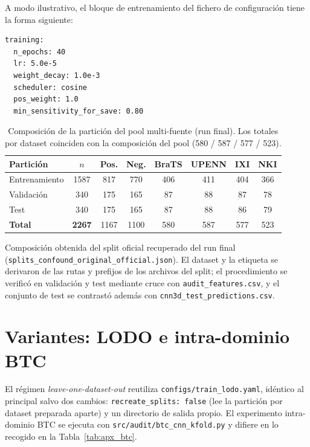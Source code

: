 A modo ilustrativo, el bloque de entrenamiento del fichero de configuración tiene
la forma siguiente:

\begin{verbatim}
training:
  n_epochs: 40
  lr: 5.0e-5
  weight_decay: 1.0e-3
  scheduler: cosine
  pos_weight: 1.0
  min_sensitivity_for_save: 0.80
\end{verbatim}

\begin{table}[ht]
  \centering
  \caption[Composición de los splits del pool]{Composición de la partición del
  pool multi-fuente (run final). Los totales por dataset coinciden con la
  composición del pool (580 / 587 / 577 / 523).}
  \label{tab:apx_splits}
  \begin{tabular}{l c c c c c c c}
    \hline
    \textbf{Partición} & \textbf{$n$} & \textbf{Pos.} & \textbf{Neg.} & \textbf{BraTS} & \textbf{UPENN} & \textbf{IXI} & \textbf{NKI} \\
    \hline
    Entrenamiento & 1587 & 817  & 770  & 406 & 411 & 404 & 366 \\
    Validación    & 340  & 175  & 165  & 87  & 88  & 87  & 78  \\
    Test          & 340  & 175  & 165  & 87  & 88  & 86  & 79  \\
    \hline
    \textbf{Total} & \textbf{2267} & 1167 & 1100 & 580 & 587 & 577 & 523 \\
    \hline
  \end{tabular}

  \vspace{2pt}
  {\footnotesize Composición obtenida del split oficial recuperado del run final
(\texttt{splits\_confound\_original\_official.json}). El dataset y la etiqueta
se derivaron de las rutas y prefijos de los archivos del split; el procedimiento
se verificó en validación y test mediante cruce con \texttt{audit\_features.csv},
y el conjunto de test se contrastó además con
\texttt{cnn3d\_test\_predictions.csv}.}
\end{table}

\section{Variantes: LODO e intra-dominio BTC}

El régimen \emph{leave-one-dataset-out} reutiliza \texttt{configs/train\_lodo.yaml},
idéntico al principal salvo dos cambios: \texttt{recreate\_splits: false} (lee la
partición por dataset preparada aparte) y un directorio de salida propio. El
experimento intra-dominio BTC se ejecuta con \texttt{src/audit/btc\_cnn\_kfold.py}
y difiere en lo recogido en la Tabla~\ref{tab:apx_btc}.

